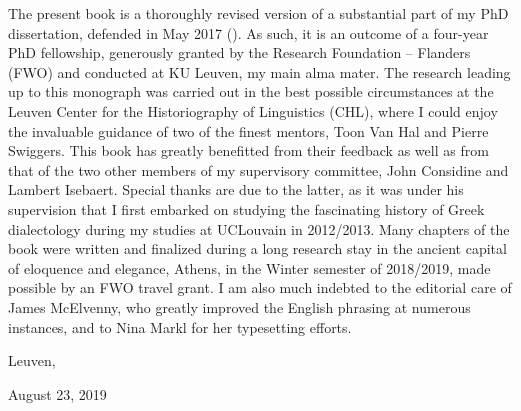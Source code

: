 \addchap{\lsAcknowledgementTitle} 
 
The present book is a thoroughly revised version of a substantial part of my PhD dissertation, defended in May 2017 (\citet{VanRooy2017}). As such, it is an outcome of a four-year PhD fellowship, generously granted by the Research Foundation – Flanders (FWO) and conducted at KU Leuven, my main alma mater. The research leading up to this monograph was carried out in the best possible circumstances at the Leuven Center for the Historiography of Linguistics (CHL), where I could enjoy the invaluable guidance of two of the finest mentors, Toon Van Hal and Pierre Swiggers. This book has greatly benefitted from their feedback as well as from that of the two other members of my supervisory committee, John Considine and Lambert Isebaert. Special thanks are due to the latter, as it was under his supervision that I first embarked on studying the fascinating history of Greek dialectology during my studies at UCLouvain in 2012/2013. Many chapters of the book were written and finalized during a long research stay in the ancient capital of eloquence and elegance, Athens, in the Winter semester of 2018/2019, made possible by an FWO travel grant. I am also much indebted to the editorial care of James McElvenny, who greatly improved the English phrasing at numerous instances, and to Nina Markl for her typesetting efforts.

Leuven,

August 23, 2019


